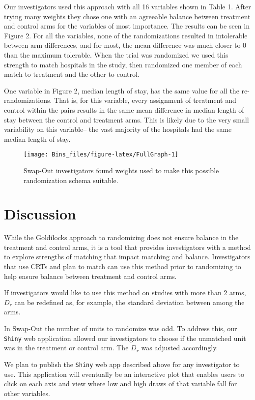 \documentclass[]{article}
\begin{document}
Our investigators used this approach with all 16 variables shown in
Table 1. After trying many weights they chose one with an agreeable
balance between treatment and control arms for the variables of most
importance. The results can be seen in Figure 2. For all the variables,
none of the randomizations resulted in intolerable between-arm
differences, and for most, the mean difference was much closer to 0 than
the maximum tolerable. When the trial was randomized we used this
strength to match hospitals in the study, then randomized one member of
each match to treatment and the other to control.

One variable in Figure 2, median length of stay, has the same value for
all the re-randomizations. That is, for this variable, every assignment
of treatment and control within the pairs results in the same mean
difference in median length of stay between the control and treatment
arms. This is likely due to the very small variability on this
variable-- the vast majority of the hospitals had the same median length
of stay.

\begin{figure}

{\centering \texttt{[image: Bins\_files/figure-latex/FullGraph-1]} 

}

\caption{Swap-Out investigators found weights used to make this possible randomization schema suitable.}\label{fig:FullGraph}
\end{figure}

\section{Discussion}\label{discussion}

While the Goldilocks approach to randomizing does not ensure balance in
the treatment and control arms, it is a tool that provides investigators
with a method to explore strengths of matching that impact matching and
balance. Investigators that use CRTs and plan to match can use this
method prior to randomizing to help ensure balance between treatment and
control arms.

If investigators would like to use this method on studies with more than
\(2\) arms, \(D_{r}\) can be redefined as, for example, the standard
deviation between among the arms.

In Swap-Out the number of units to randomize was odd. To address this,
our \texttt{Shiny} web application allowed our investigators to choose
if the unmatched unit was in the treatment or control arm. The \(D_{r}\)
was adjusted accordingly.

We plan to publish the \texttt{Shiny} web app described above for any
investigator to use. This application will eventually be an interactive
plot that enables users to click on each axis and view where low and
high draws of that variable fall for other variables.


\end{document}
